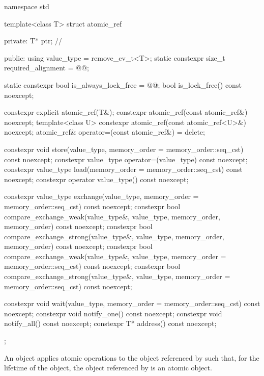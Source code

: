 %
%
\begin{codeblock}
namespace std {
  template<class T> struct atomic_ref {
  private:
    T* ptr;             // \expos

  public:
    using value_type = remove_cv_t<T>;
    static constexpr size_t required_alignment = @@;

    static constexpr bool is_always_lock_free = @@;
    bool is_lock_free() const noexcept;

    constexpr explicit atomic_ref(T&);
    constexpr atomic_ref(const atomic_ref&) noexcept;
    template<class U>
      constexpr atomic_ref(const atomic_ref<U>&) noexcept;
    atomic_ref& operator=(const atomic_ref&) = delete;

    constexpr void store(value_type, memory_order = memory_order::seq_cst) const noexcept;
    constexpr value_type operator=(value_type) const noexcept;
    constexpr value_type load(memory_order = memory_order::seq_cst) const noexcept;
    constexpr operator value_type() const noexcept;

    constexpr value_type exchange(value_type,
                                  memory_order = memory_order::seq_cst) const noexcept;
    constexpr bool compare_exchange_weak(value_type&, value_type,
                                         memory_order, memory_order) const noexcept;
    constexpr bool compare_exchange_strong(value_type&, value_type,
                                           memory_order, memory_order) const noexcept;
    constexpr bool compare_exchange_weak(value_type&, value_type,
                                         memory_order = memory_order::seq_cst) const noexcept;
    constexpr bool compare_exchange_strong(value_type&, value_type,
                                           memory_order = memory_order::seq_cst) const noexcept;

    constexpr void wait(value_type, memory_order = memory_order::seq_cst) const noexcept;
    constexpr void notify_one() const noexcept;
    constexpr void notify_all() const noexcept;
    constexpr T* address() const noexcept;
  };
}
\end{codeblock}

\pnum
An  object applies atomic operations to
the object referenced by  such that,
for the lifetime of the  object,
the object referenced by  is an atomic object.

